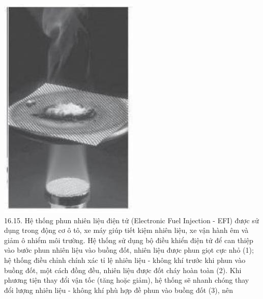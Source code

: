 \documentclass[10pt]{article}
\begin{document}
\includegraphics[max width=\textwidth, center]{2025_10_23_883c4b146e2332109fcdg-65}\\
16.15. Hệ thống phun nhiên liệu điện tử (Electronic Fuel Injection - EFI) được sử dụng trong động cơ ô tô, xe máy giúp tiết kiệm nhiên liệu, xe vận hành êm và giảm ô nhiểm môi trường. Hệ thống sử dụng bộ điều khiển điện tử để can thiệp vào bước phun nhiên liệu vào buồng đốt, nhiên liệu được phun giọt cực nhỏ (1); hệ thống điều chỉnh chính xác tỉ lệ nhiên liệu - không khí trước khi phun vào buồng đốt, một cách đồng đều, nhiên liệu được đốt cháy hoàn toàn (2). Khi phương tiện thay đổi vận tốc (tăng hoặc giảm), hệ thống sẽ nhanh chóng thay đổi lượng nhiên liệu - không khí phù hợp đề phun vào buồng đốt (3), nên\\
\end{document}
